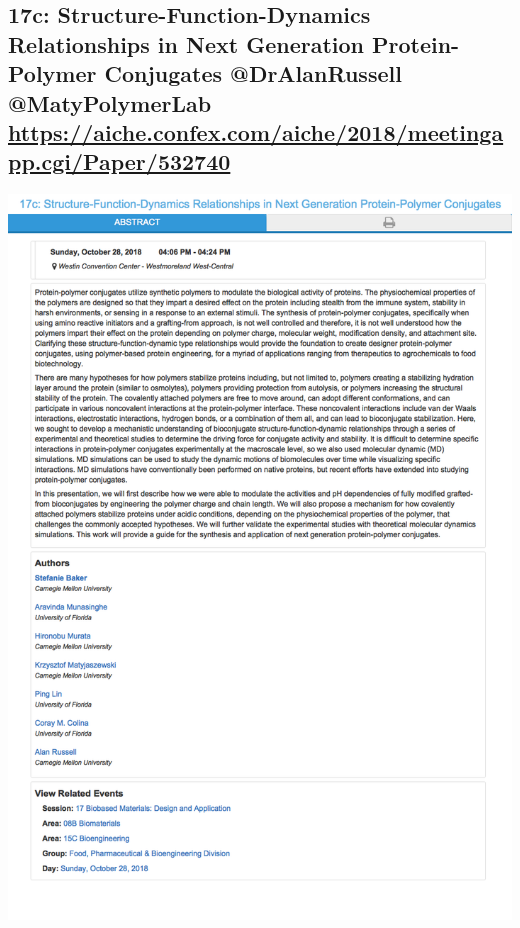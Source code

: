 \documentclass[11pt]{article}
\begin{document}
\subsection{17c: Structure-Function-Dynamics Relationships in Next Generation Protein-Polymer Conjugates @DrAlanRussell @MatyPolymerLab \url{https://aiche.confex.com/aiche/2018/meetingapp.cgi/Paper/532740}}
\label{sec:org98f7ae0}
\begin{center}
\includegraphics[width=.9\linewidth]{./532740.png}
\end{center}
\end{document}
